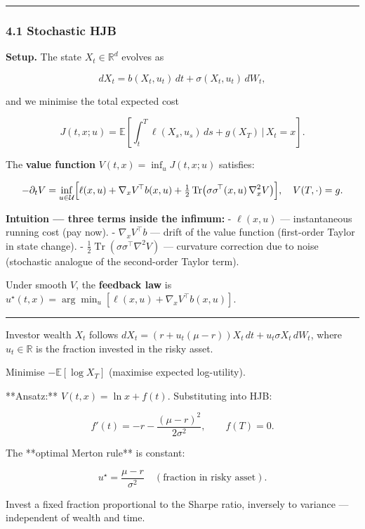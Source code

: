 \documentclass[11pt,a4paper]{article}
\begin{document}
\begin{center}\rule{0.5\linewidth}{0.5pt}\end{center}

\subsubsection{4.1 Stochastic HJB}\label{stochastic-hjb}

\textbf{Setup.} The state \(X_t \in \mathbb{R}^d\) evolves as

\[dX_t = b(X_t,u_t)\,dt + \sigma(X_t,u_t)\,dW_t,\]

and we minimise the total expected cost

\[J(t,x;u) = \mathbb{E}\!\left[\int_t^T \ell(X_s,u_s)\,ds + g(X_T)\,\Big|\,X_t=x\right].\]

The \textbf{value function} \(V(t,x) = \inf_u J(t,x;u)\) satisfies:

\[-\partial_t V = \inf_{u\in\mathcal{U}}\Bigl[\ell(x,u) + \nabla_x V^{\!\top} b(x,u)
+ \tfrac12\operatorname{Tr}\bigl(\sigma\sigma^{\!\top}(x,u)\,\nabla_x^2 V\bigr)\Bigr],
\quad V(T,\cdot)=g.\]

\textbf{Intuition --- three terms inside the infimum:} - \(\ell(x,u)\) --- instantaneous running cost (pay now). - \(\nabla_x V^\top b\) --- drift of the value function (first-order Taylor in state change). - \(\tfrac12\operatorname{Tr}(\sigma\sigma^\top\nabla^2 V)\) --- curvature correction due to noise (stochastic analogue of the second-order Taylor term).

Under smooth \(V\), the \textbf{feedback law} is \(u^\star(t,x) = \arg\min_u[\ell(x,u)+\nabla_x V^\top b(x,u)].\)

\begin{center}\rule{0.5\linewidth}{0.5pt}\end{center}

\begin{tcolorbox}[colback=notebg!60,colframe=optgreen,fonttitle=\bfseries\sffamily,title={\textsf{\textbf{Example}} — Example — Optimal Portfolio Allocation (Merton 1969)},breakable]
Investor wealth $X_t$ follows
$dX_t = (r + u_t(\mu-r))X_t\,dt + u_t\sigma X_t\,dW_t$,
where $u_t\in\mathbb{R}$ is the fraction invested in the risky asset.

Minimise $-\mathbb{E}[\log X_T]$ (maximise expected log-utility).

**Ansatz:** $V(t,x) = \ln x + f(t)$.  Substituting into HJB:

$$f'(t) = -r - \frac{(\mu-r)^2}{2\sigma^2},\qquad f(T)=0.$$

The **optimal Merton rule** is constant:

$$u^\star = \frac{\mu-r}{\sigma^2} \quad (\text{fraction in risky asset}).$$

Invest a fixed fraction proportional to the Sharpe ratio, inversely to variance —
independent of wealth and time.
\end{tcolorbox}
\end{document}
